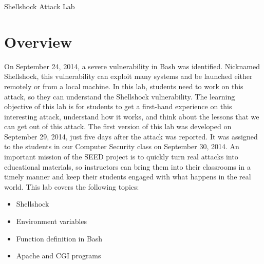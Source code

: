 




\newcommand{\bash}{{\tt bash}\xspace}
\newcommand{\Bash}{{\tt Bash}\xspace}




\begin{center}
{\LARGE Shellshock Attack Lab}
\end{center}


\section{Overview}

On September 24, 2014, a severe vulnerability in Bash was identified.
Nicknamed Shellshock, this vulnerability can exploit many systems and be
launched either remotely or from a local machine.  In this
lab, students need to work on this attack, so they can understand the
Shellshock vulnerability. The learning objective of this lab is for students to get a
first-hand experience on this interesting attack, understand how it
works, and think about the lessons that we can get out of this
attack. The first version of this lab was developed on September 29, 2014, 
just five days after the attack was reported. It was assigned to the students 
in our Computer Security class on September 30, 2014. An important mission
of the SEED project is to quickly turn real attacks 
into educational materials, so instructors can bring them into their
classrooms in a timely manner and keep their students engaged with what
happens in the real world. This lab covers the following topics:

\begin{itemize}[noitemsep]
\item Shellshock
\item Environment variables 
\item Function definition in Bash
\item Apache and CGI programs
\end{itemize}


